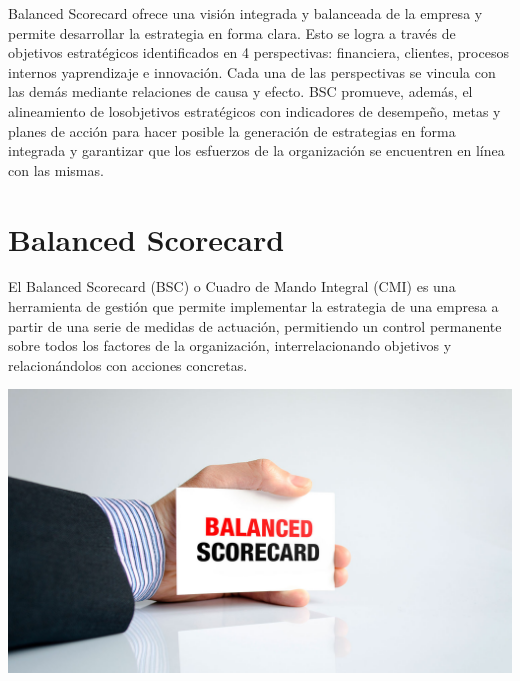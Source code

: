 Balanced Scorecard ofrece una visión integrada y balanceada de la empresa y permite desarrollar la estrategia en forma clara. Esto se logra a través de objetivos estratégicos identificados en 4 perspectivas: financiera, clientes, procesos internos yaprendizaje e innovación. Cada una de las perspectivas se vincula con las demás mediante relaciones de causa y efecto. BSC promueve, además, el alineamiento de losobjetivos estratégicos con indicadores de desempeño, metas y planes de acción para hacer posible la generación de estrategias en forma integrada y garantizar que los esfuerzos de la organización se encuentren en línea con las mismas.
\newpage


\section{Balanced Scorecard}
\item{El Balanced Scorecard (BSC) o Cuadro de Mando Integral (CMI) es una herramienta de gestión que permite implementar la estrategia de una empresa a partir de una serie de medidas de actuación, permitiendo un control permanente sobre todos los factores de la organización, interrelacionando objetivos y relacionándolos con acciones concretas.}

\begin{center}
\includegraphics[width=15cm]{./Imagenes/imagen1}
\end{center}

